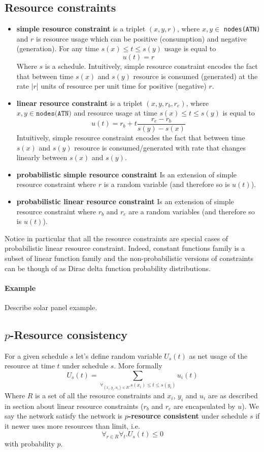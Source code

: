 \documentclass{article}
\begin{document}
\begin{multicols}{2}
\subsection{Resource constraints}
\begin{itemize}
\item \textbf{simple resource constraint} is a triplet $(x, y, r)$, where $x, y \in$ \texttt{nodes(ATN)} and $r$ is resource usage which can be positive (consumption) and negative (generation). For any time $s(x) \leq t \leq s(y)$ usage is equal to
\[
u(t) = r
\]
Where $s$ is a schedule. Intuitively, simple resource constraint encodes the fact that between time $s(x)$ and $s(y)$  resource is consumed (generated) at the rate $|r$| units of resource per unit time for positive (negative) $r$.
\item \textbf{linear resource constraint} is a triplet $(x, y, r_b, r_e)$, where $x, y \in \texttt{nodes(ATN)}$ and resource usage at time $s(x) \leq t \leq s(y)$ is equal to
\[
    u(t) = r_b + t  \frac{r_e - r_b}{s(y) - s(x)}
\]
Intuitively, simple resource constraint encodes the fact that between time $s(x)$ and $s(y)$  resource is consumed/generated with rate that changes linearly between $s(x)$ and $s(y)$.
\item \textbf{probabilistic simple resource constraint}
Is an extension of simple resource constraint where $r$ is a random variable (and therefore so is $u(t)$).
\item \textbf{probabilistic linear resource constraint}
Is an extension of simple resource constraint where $r_b$ and $r_e$ are a random variables (and therefore so is $u(t)$).
\end{itemize}
Notice in particular that all the resource constraints are special cases of probabilistic linear resource constraint. Indeed, constant functions family is a subset of linear function family and the non-probabilistic versions of constraints can be though of as Dirac delta function probability distributions.

\paragraph{Example} Describe solar panel example.


\subsection{$p$-Resource consistency}
For a given schedule $s$ let's define random variable $U_s(t)$ as net usage of the resource at time $t$ under schedule $s$. More formally
\[
U_s(t) = \sum_{\forall_{(x_i,y_i,u_i) \in R}. s(x_i)\leq t \leq s(y_i)} u_i(t)
\]
Where $R$ is a set of all the resource constraints and $x_i$, $y_i$ and $u_i$ are as described in section about linear resource constraints ($r_b$ and $r_e$ are encapsulated by $u$). We say the network satisfy the network is \textbf{$p$-resource consistent} under schedule $s$ if it newer uses more resources than limit, i.e.
\[
\forall_{r \in R} \forall_{t} . U_s(t) \leq 0
\]
with probability $p$.


\end{multicols}
\end{document}

